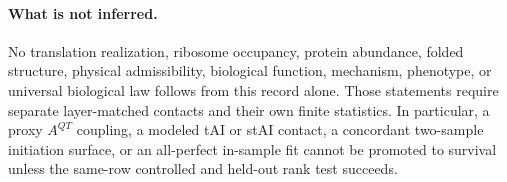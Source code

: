 \paragraph{What is not inferred.}
No translation realization, ribosome occupancy, protein abundance, folded structure, physical admissibility, biological function, mechanism, phenotype, or universal biological law follows from this record alone. Those statements require separate layer-matched contacts and their own finite statistics. In particular, a proxy $A^{QT}$ coupling, a modeled tAI or stAI contact, a concordant two-sample initiation surface, or an all-perfect in-sample fit cannot be promoted to survival unless the same-row controlled and held-out rank test succeeds.